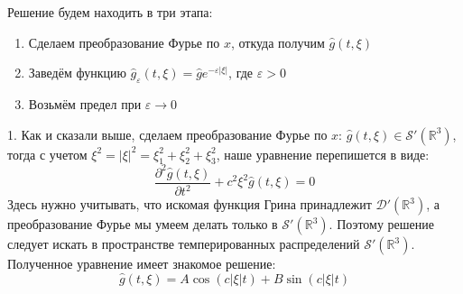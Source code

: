 \documentclass[11pt,a4paper]{report}
\numberwithin{equation}{section}
\numberwithin{figure}{chapter}
\numberwithin{table}{chapter}
\newcommand{\R}{\mathbb{R}}
\newcommand{\D}{\mathcal{D}}
\newcommand{\p}{\partial}
\renewcommand{\epsilon}{\varepsilon}
\begin{document}
Решение будем находить в три этапа:
\begin{enumerate}
    \item Сделаем преобразование Фурье по $x$, откуда получим $\hat{g}(t,\xi)$
    \item Заведём функцию $\hat{g}_\epsilon(t,\xi) = \hat{g}e^{-\epsilon|\xi|}$, где $\epsilon>0$
    \item Возьмём предел при $\varepsilon \rightarrow 0 $
\end{enumerate}

1. Как и сказали выше, сделаем преобразование Фурье по $x$:
$\hat{g}(t,\xi) \in \mathcal{S}'(\R^3) $, тогда с учетом $\xi^2=|\xi|^2=\xi^2_1+\xi^2_2+\xi^2_3$, 
 наше уравнение перепишется в виде:
\[
 \dfrac{\p^2 \hat{g}(t,\xi)}{\p t^2} + c^2\xi^2\hat{g}(t,\xi) = 0
\]
Здесь нужно учитывать, что искомая функция Грина принадлежит $\D'(\R^3) $, а преобразование Фурье мы умеем делать 
только в $\mathcal{S}'(\R^3)$. Поэтому решение следует искать в пространстве темперированных распределений $\mathcal{S}'(\R^3)$. Полученное уравнение имеет знакомое решение:
\[
\hat{g}(t,\xi) = A\cos(c|\xi|t) + B\sin(c|\xi|t)
\]
\end{document}
